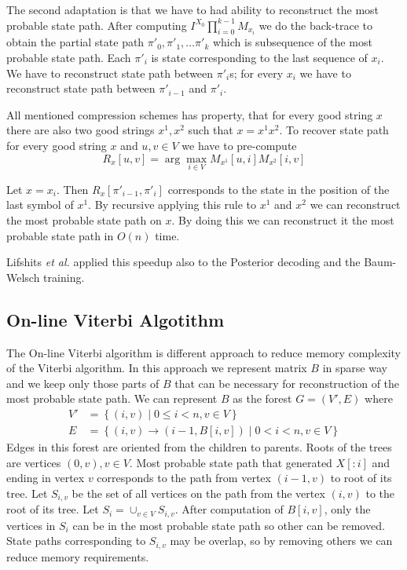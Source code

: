The second adaptation is that we have to had ability to reconstruct 
the most probable state path.
After computing $I^{X_0}\prod_{i=0}^{k-1}M_{x_i}$ we do the back-trace to obtain 
the partial state path $\pi'_0,\pi'_1,\dots \pi'_{k}$ which is subsequence of the
most probable state path. Each $\pi'_i$ is state corresponding to the last
sequence of $x_i$. We have to reconstruct state path between $\pi'_i$s; for
every $x_i$ we have to reconstruct state path between $\pi'_{i-1}$ and $\pi'_i$.

All mentioned compression schemes has property,
that for every good string $x$ there are also two good strings $x^1,x^2$ such
that $x=x^1x^2$. To recover state path for every good string $x$ and $u,v\in V$
we have to pre-compute \[R_x[u,v] = \arg\max_{i\in V}M_{x^1}[u,i]M_{x^2}[i,v]\]

Let $x=x_i$. Then $R_{x}[\pi'_{i-1},\pi'_{i}]$ corresponds to the state in the
position of the last symbol of $x^1$. By recursive applying this rule to $x^1$
and $x^2$ we can reconstruct the most probable state path on $x$. By doing this
we can reconstruct it the most probable state path in $O(n)$ time.

Lifshits {\it et al.} applied this  speedup also to the Posterior decoding and
the Baum-Welsch training. 


\subsection{On-line Viterbi Algotithm}
\label{SECTION:ONLINEVITERBI}

The On-line Viterbi algorithm is different approach to reduce memory complexity of
the Viterbi algorithm. In this approach we represent matrix $B$ in sparse way
and we keep only those parts of $B$ that can be necessary for reconstruction of
the most probable state path.
We can represent $B$ as the forest $G=(V',E)$ where
\begin{align*}
V' &= \left\{ (i,v)\mid 0\leq i< n, v\in V  \right\}\\
E &= \left\{ (i,v)\to (i-1,B[i,v])\mid 0<i<n,v\in V\right\}
\end{align*}
Edges in this forest are oriented from the children to parents. Roots of the
trees are vertices $(0,v),v\in V$.  Most probable state path that generated
$X[:i]$ and ending in vertex $v$ corresponds to the path from vertex $(i-1,v)$
to root of its tree. Let $S_{i,v}$ be the set of all vertices on the path from
the vertex
$(i,v)$ to the root of its tree. Let $S_i=\cup_{v\in V}S_{i,v}$.
After computation of $B[i,v]$, only the vertices in $S_i$ can be in the most
probable state path so other can be removed. State paths corresponding to
$S_{i,v}$ may be overlap, so by removing others we can reduce memory
requirements.

